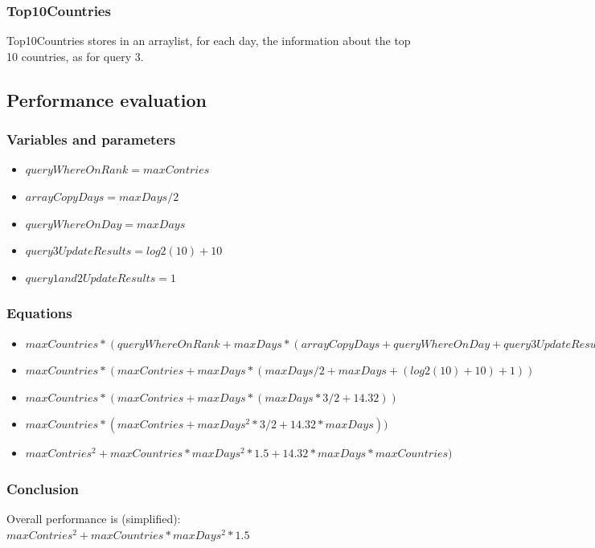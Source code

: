 \documentclass[table, 12pt]{article}
\begin{document}
\subsubsection{Top10Countries}
Top10Countries stores in an arraylist, for each day, the information about the top 10 countries, as for query 3.


\subsection{Performance evaluation}

\subsubsection{Variables and parameters}
\begin{flushleft}
\begin{itemize}
\setlength\itemsep{-0.5em}
\item $ queryWhereOnRank = maxContries $
\item $ arrayCopyDays = maxDays/2 $
\item $ queryWhereOnDay = maxDays $
\item $ query3UpdateResults = log2(10) + 10 $
\item $ query1and2UpdateResults = 1 $
\end{itemize}
\end{flushleft}

\subsubsection{Equations}
\begin{flushleft}
\begin{itemize}
\setlength\itemsep{-0.5em}
\item $ maxCountries * ( queryWhereOnRank + maxDays * (arrayCopyDays + queryWhereOnDay + query3UpdateResults + query1and2UpdateResults) )  $
\item $ maxCountries * ( maxContries + maxDays * (maxDays/2 + maxDays + (log2(10)+10) + 1) ) $
\item $ maxCountries * ( maxContries + maxDays * (maxDays* 3/2 + 14.32) ) $
\item $ maxCountries * ( maxContries + maxDays^2 * 3/2 + 14.32 * maxDays) ) $
\item $  maxContries^2 + maxCountries * maxDays^2 * 1.5 + 14.32 * maxDays * maxCountries) $
\end{itemize}
\end{flushleft}


\subsubsection{Conclusion}

Overall performance is (simplified): \\
  $  maxContries^2 + maxCountries * maxDays^2 * 1.5 $
\end{document}

